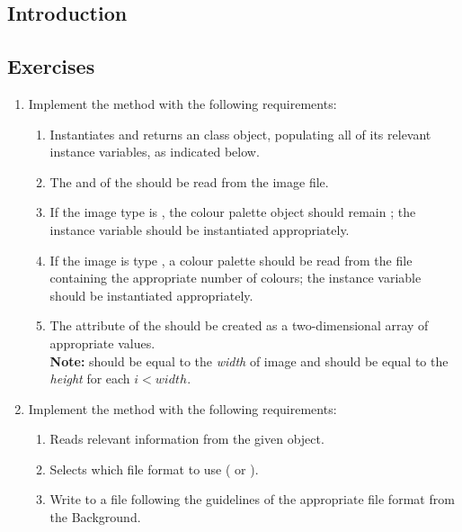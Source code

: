     \subsection{Introduction}
    \subsection{Exercises}
      \begin{enumerate}
        \item Implement the  method with the following requirements:
          \begin{enumerate}
            \item Instantiates and returns an  class object, populating all of its relevant instance variables, as indicated below.
            \item The  and  of the  should be read from the image file.              
            \item If the image type is , the colour palette object should remain ; the  instance variable should be instantiated appropriately.
            \item If the image is type , a colour palette should be read from the file containing the appropriate number of colours; the  instance variable should be instantiated appropriately.
            \item The  attribute of the  should be created as a two-dimensional array of appropriate values.\\
            {\small\textbf{Note:}  should be equal to the \emph{width} of image and  should be equal to the \emph{height} for each $i < width$.}
          \end{enumerate}
        \item Implement the  method with the following requirements:
          \begin{enumerate}
            \item Reads relevant information from the given  object.
            \item Selects which file format to use ( or ).
            \item Write to a file following the guidelines of the appropriate file format from the Background.
          \end{enumerate}
      \end{enumerate}
